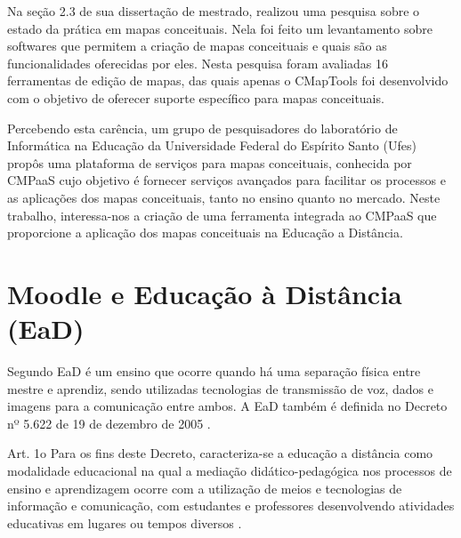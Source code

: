 \documentclass[
	12pt,				%
	openright,			%
	oneside,			%
	a4paper,			%
	english,			%
	french,				%
	spanish,			%
	brazil				%
	]{abntex2}
\begin{document}
Na seção 2.3 de sua dissertação de mestrado,  realizou uma pesquisa sobre o estado da prática em mapas conceituais. Nela foi feito um levantamento sobre softwares que permitem a criação de mapas conceituais e quais são as funcionalidades oferecidas por eles. Nesta pesquisa foram avaliadas 16 ferramentas de edição de mapas, das quais apenas o CMapTools foi desenvolvido com o objetivo de oferecer suporte específico para mapas conceituais.

Percebendo esta carência, um grupo de pesquisadores do laboratório de Informática na Educação da Universidade Federal do Espírito Santo (Ufes) propôs uma plataforma de serviços para mapas conceituais, conhecida por CMPaaS \cite{Perin2016} cujo objetivo é fornecer serviços avançados para facilitar os processos e as aplicações dos mapas conceituais, tanto no ensino quanto no mercado. Neste trabalho, interessa-nos a criação de uma ferramenta integrada ao CMPaaS que proporcione a aplicação dos mapas conceituais na Educação a Distância. 
  




\section{Moodle e Educação à Distância (EaD)}\label{cap-ead}

Segundo  EaD é um ensino que ocorre quando há uma separação física entre mestre e aprendiz, sendo utilizadas tecnologias de transmissão de voz, dados e imagens para a comunicação entre ambos. A EaD também é definida no Decreto nº 5.622 de 19 de dezembro de 2005 \cite{BRASIL2005}.
 \begin{citacao}
 	Art. 1o  Para os fins deste Decreto, caracteriza-se a educação a distância como modalidade educacional na qual a mediação didático-pedagógica nos processos de ensino e aprendizagem ocorre com a utilização de meios e tecnologias de informação e comunicação, com estudantes e professores desenvolvendo atividades educativas em lugares ou tempos diversos \cite{BRASIL2005}.
 \end{citacao}
 
\end{document}
